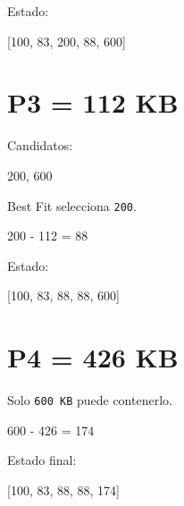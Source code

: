 \documentclass[
  spanish,
  letterpaper,
]{scrbook}
\newenvironment{Shaded}{\begin{snugshade}}{\end{snugshade}}
\newcommand{\NormalTok}[1]{\textcolor[rgb]{0.00,0.23,0.31}{#1}}
\begin{document}
Estado:

\begin{Shaded}
\begin{Highlighting}[]
\NormalTok{[100, 83, 200, 88, 600]}
\end{Highlighting}
\end{Shaded}

\section{P3 = 112 KB}\label{p3-112-kb-4}

Candidatos:

\begin{Shaded}
\begin{Highlighting}[]
\NormalTok{200, 600}
\end{Highlighting}
\end{Shaded}

Best Fit selecciona \texttt{200}.

\begin{Shaded}
\begin{Highlighting}[]
\NormalTok{200 {-} 112 = 88}
\end{Highlighting}
\end{Shaded}

Estado:

\begin{Shaded}
\begin{Highlighting}[]
\NormalTok{[100, 83, 88, 88, 600]}
\end{Highlighting}
\end{Shaded}

\section{P4 = 426 KB}\label{p4-426-kb-4}

Solo \texttt{600\ KB} puede contenerlo.

\begin{Shaded}
\begin{Highlighting}[]
\NormalTok{600 {-} 426 = 174}
\end{Highlighting}
\end{Shaded}

Estado final:

\begin{Shaded}
\begin{Highlighting}[]
\NormalTok{[100, 83, 88, 88, 174]}
\end{Highlighting}
\end{Shaded}
\end{document}
